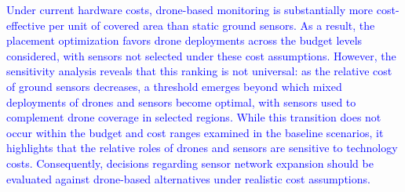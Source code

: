 \documentclass[pdflatex,sn-mathphys-num]{sn-jnl}%
\theoremstyle{thmstyleone}%
\theoremstyle{thmstyletwo}%
\theoremstyle{thmstylethree}%
\newcommand{\blue}[1]{\textcolor{blue}{#1}}
\begin{document}


\blue{Under current hardware costs, drone-based monitoring is substantially more cost-effective per unit of covered area than static ground sensors. As a result, the placement optimization favors drone deployments across the budget levels considered, with sensors not selected under these cost assumptions. However, the sensitivity analysis reveals that this ranking is not universal: as the relative cost of ground sensors decreases, a threshold emerges beyond which mixed deployments of drones and sensors become optimal, with sensors used to complement drone coverage in selected regions. While this transition does not occur within the budget and cost ranges examined in the baseline scenarios, it highlights that the relative roles of drones and sensors are sensitive to technology costs. Consequently, decisions regarding sensor network expansion should be evaluated against drone-based alternatives under realistic cost assumptions.}
\end{document}
